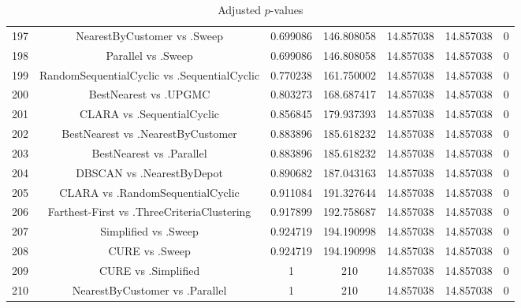 \documentclass[a4paper,10pt]{article}
\begin{document}
\begin{landscape}
\begin{table}[!htp]
\begin{tabular}{ccccccc}
197&NearestByCustomer vs .Sweep&0.699086&146.808058&14.857038&14.857038&0\\
198&Parallel vs .Sweep&0.699086&146.808058&14.857038&14.857038&0\\
199&RandomSequentialCyclic vs .SequentialCyclic&0.770238&161.750002&14.857038&14.857038&0\\
200&BestNearest vs .UPGMC&0.803273&168.687417&14.857038&14.857038&0\\
201&CLARA vs .SequentialCyclic&0.856845&179.937393&14.857038&14.857038&0\\
202&BestNearest vs .NearestByCustomer&0.883896&185.618232&14.857038&14.857038&0\\
203&BestNearest vs .Parallel&0.883896&185.618232&14.857038&14.857038&0\\
204&DBSCAN vs .NearestByDepot&0.890682&187.043163&14.857038&14.857038&0\\
205&CLARA vs .RandomSequentialCyclic&0.911084&191.327644&14.857038&14.857038&0\\
206&Farthest-First vs .ThreeCriteriaClustering&0.917899&192.758687&14.857038&14.857038&0\\
207&Simplified vs .Sweep&0.924719&194.190998&14.857038&14.857038&0\\
208&CURE vs .Sweep&0.924719&194.190998&14.857038&14.857038&0\\
209&CURE vs .Simplified&1&210&14.857038&14.857038&0\\
210&NearestByCustomer vs .Parallel&1&210&14.857038&14.857038&0\\
\hline
\end{tabular}
\caption{Adjusted $p$-values}
\end{table}

\end{landscape}
\end{document}
